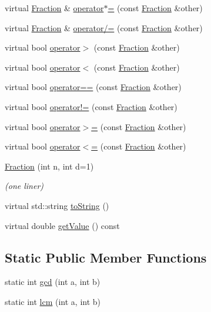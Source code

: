 \begin{DoxyCompactItemize}
virtual \hyperlink{class_alg_lib_1_1_fraction}{Fraction} \& \hyperlink{class_alg_lib_1_1_fraction_a43503b8b709459edb0445eceeb0eea55}{operator$\ast$=} (const \hyperlink{class_alg_lib_1_1_fraction}{Fraction} \&other)
\item 
virtual \hyperlink{class_alg_lib_1_1_fraction}{Fraction} \& \hyperlink{class_alg_lib_1_1_fraction_a5e0a2558eb0566f86826c8c97275b391}{operator/=} (const \hyperlink{class_alg_lib_1_1_fraction}{Fraction} \&other)
\item 
virtual bool \hyperlink{class_alg_lib_1_1_fraction_aa6d4323da2799ffda77543d955ef0ae7}{operator$>$} (const \hyperlink{class_alg_lib_1_1_fraction}{Fraction} \&other)
\item 
virtual bool \hyperlink{class_alg_lib_1_1_fraction_aad1c9b3fec500e7538435d4e3e329101}{operator$<$} (const \hyperlink{class_alg_lib_1_1_fraction}{Fraction} \&other)
\item 
virtual bool \hyperlink{class_alg_lib_1_1_fraction_a5f61edd6dbf3616996fa44195701fc00}{operator==} (const \hyperlink{class_alg_lib_1_1_fraction}{Fraction} \&other)
\item 
virtual bool \hyperlink{class_alg_lib_1_1_fraction_a1e3623fabfa02de42052943a319fc2b5}{operator!=} (const \hyperlink{class_alg_lib_1_1_fraction}{Fraction} \&other)
\item 
virtual bool \hyperlink{class_alg_lib_1_1_fraction_ac13e475bba27f25e1b1f8b2de3aed36c}{operator$>$=} (const \hyperlink{class_alg_lib_1_1_fraction}{Fraction} \&other)
\item 
virtual bool \hyperlink{class_alg_lib_1_1_fraction_a13e7582666ef2218c3f430302464f4ac}{operator$<$=} (const \hyperlink{class_alg_lib_1_1_fraction}{Fraction} \&other)
\item 
\hyperlink{class_alg_lib_1_1_fraction_a6d2b59a227bfcb55e852f07751949ff4}{Fraction} (int n, int d=1)
\begin{DoxyCompactList}\small\item\em (one liner) \end{DoxyCompactList}\item 
virtual std\+::string \hyperlink{class_alg_lib_1_1_fraction_a28d61a593ab5abaac86f091398cf7e00}{to\+String} ()
\item 
virtual double \hyperlink{class_alg_lib_1_1_fraction_af56bf89da08dd47e3dfc28d365195d46}{get\+Value} () const 
\end{DoxyCompactItemize}
\subsection*{Static Public Member Functions}
\begin{DoxyCompactItemize}
\item 
static int \hyperlink{class_alg_lib_1_1_fraction_ab63e88e7785efe993305ff803e35efa2}{gcd} (int a, int b)
\item 
static int \hyperlink{class_alg_lib_1_1_fraction_a6f95fe4660cfda996102bf5f4240fe4c}{lcm} (int a, int b)
\end{DoxyCompactItemize}
